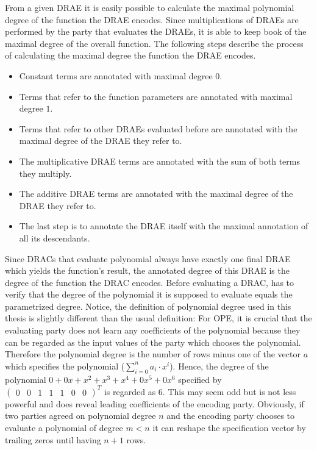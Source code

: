 \label{sec:max-poly-degree}

From a given DRAE it is easily possible to calculate the maximal polynomial
degree of the function the DRAE encodes. Since multiplications of DRAEs are
performed by the party that evaluates the DRAEs, it is able to keep book of the
maximal degree of the overall function. The following steps describe the process
of calculating the maximal degree the function the DRAE encodes.

\begin{itemize}

  \item Constant terms are annotated with maximal degree $0$.

  \item Terms that refer to the function parameters are annotated with maximal
    degree $1$.

  \item Terms that refer to other DRAEs evaluated before are annotated with the
    maximal degree of the DRAE they refer to.

  \item The multiplicative DRAE terms are annotated with the sum of both terms
    they multiply.

  \item The additive DRAE terms are annotated with the maximal degree of the
    DRAE they refer to.

  \item The last step is to annotate the DRAE itself with the maximal annotation
    of all its descendants.

\end{itemize}

\noindent{}Since DRACs that evaluate polynomial always have exactly one final
DRAE which yields the function's result, the annotated degree of this DRAE is
the degree of the function the DRAC encodes. Before evaluating a DRAC, \JWpTwo{}
has to verify that the degree of the polynomial it is supposed to evaluate
equals the parametrized degree.  Notice, the definition of polynomial degree
used in this thesis is slightly different than the usual definition: For OPE, it
is crucial that the evaluating party does not learn any coefficients of the
polynomial because they can be regarded as the input values of the party which
chooses the polynomial.  Therefore the polynomial degree is the number of rows
minus one of the vector $a$ which specifies the polynomial ($\sum_{i=0}^n
a_i\cdot x^i$). Hence, the degree of the polynomial $0 + 0x + x^2 + x^3 + x^4 +
0x^5 + 0x^6$ specified by $\begin{pmatrix}0&0&1&1&1&0&0\end{pmatrix}^T$ is
regarded as $6$.  This may seem odd but is not less powerful and does reveal
leading coefficients of the encoding party. Obviously, if two parties agreed on
polynomial degree $n$ and the encoding party chooses to evaluate a polynomial of
degree $m < n$ it can reshape the specification vector by trailing zeros until
having $n+1$ rows.


